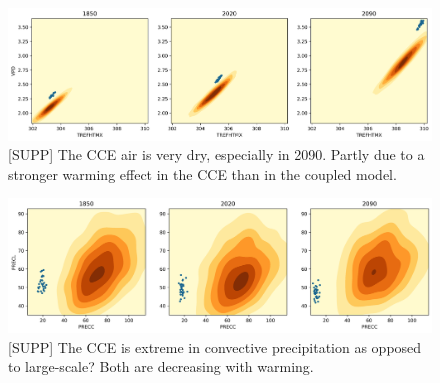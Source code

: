 \documentclass[11pt]{article}
\begin{document}
\begin{figure}[h]
\centering
\includegraphics[width=40pc]{figs/contours/TREFHTMX_VPD_contours.png}
\caption{[SUPP] The CCE air is very dry, especially in 2090. Partly due to a stronger warming effect in the CCE than in the coupled model.}
\label{fig:precip}
\end{figure}


\begin{figure}[h]
\centering
\includegraphics[width=40pc]{figs/contours/PRECC_PRECL_contours.png}
\caption{[SUPP] The CCE is extreme in convective precipitation as opposed to large-scale? Both are decreasing with warming.}
\label{fig:precip}
\end{figure}



\nocite{*}

\end{document}
